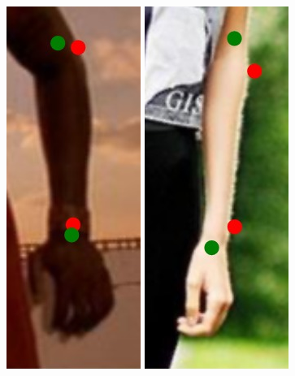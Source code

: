 \begin{figure}
    \includegraphics[height=\fh]{resources/Annotation_Correction/Fixing/fix_3}
    \hfill
    \includegraphics[height=\fh]{resources/Annotation_Correction/Fixing/fix_5}
    \hfill

\end{figure}
